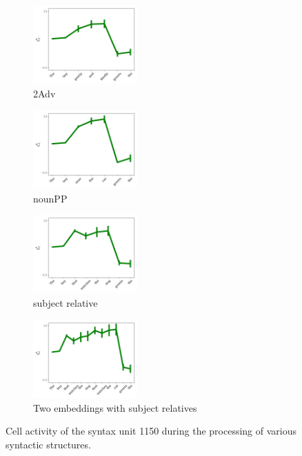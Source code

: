 \begin{figure}[t]
    \begin{subfigure}{0.49\textwidth}
            \centering
            \includegraphics[width=\linewidth, height=3cm]{Figures/adv_conjunction_1149_cell}
            \caption{2Adv}
            \label{fig:syntax-unit-2Adv}
    \end{subfigure}
    \begin{subfigure}{0.49\textwidth}
            \centering
            \includegraphics[width=\linewidth, height=3cm]{Figures/nounpp_1149_cell.png}
            \caption{nounPP}
            \label{fig:syntax-unit-nounpp}
    \end{subfigure}
    \begin{subfigure}{0.49\textwidth}
            \centering
            \includegraphics[width=\linewidth, height=3cm]{Figures/subjrel_that_1149_cell.png}
            \caption{subject relative}
            \label{fig:syntax-unit-subjrel}
    \end{subfigure}
    \begin{subfigure}{0.49\textwidth}
            \centering
            \includegraphics[width=\linewidth, height=3cm]{Figures/double_subjrel_that_1149_cell.png}
            \caption{Two embeddings with subject relatives}
            \label{fig:syntax-unit-double-subjrel}
    \end{subfigure}
\caption{Cell activity of the syntax unit 1150 during the processing of various syntactic structures.}
\end{figure}

